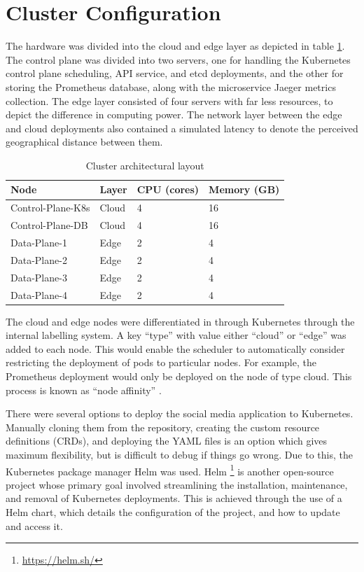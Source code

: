 \section{Cluster Configuration}
\label{sec:ch5-cluster-config}

The hardware was divided into the cloud and edge layer as depicted in table \ref{tab:cluster-hw-overview}. The control plane was divided into two servers, one for handling the Kubernetes control plane scheduling, API service, and etcd deployments, and the other for storing the Prometheus database, along with the microservice Jaeger metrics collection. The edge layer consisted of four servers with far less resources, to depict the difference in computing power. The network layer between the edge and cloud deployments also contained a simulated latency to denote the perceived geographical distance between them.\par

\begin{table}
    \caption{Cluster architectural layout}\label{tab:cluster-hw-overview}
    \centering
    \begin{tabular}{|l|l|l|l|}
        \hline
        Node & Layer & CPU (cores) & Memory (GB)\\
        \hline
        Control-Plane-K8s & Cloud & 4 & 16\\
        Control-Plane-DB  & Cloud & 4 & 16\\
        Data-Plane-1      & Edge  & 2 & 4\\
        Data-Plane-2      & Edge  & 2 & 4\\
        Data-Plane-3      & Edge  & 2 & 4\\
        Data-Plane-4      & Edge  & 2 & 4\\
        \hline
    \end{tabular}
\end{table}

The cloud and edge nodes were differentiated in through Kubernetes through the internal labelling system. A key ``type'' with value either ``cloud'' or ``edge'' was added to each node. This would enable the scheduler to automatically consider restricting the deployment of pods to particular nodes. For example, the Prometheus deployment would only be deployed on the node of type cloud. This process is known as ``node affinity'' \cite{santos2019towards}.\par

There were several options to deploy the social media application to Kubernetes. Manually cloning them from the repository, creating the custom resource definitions (CRDs), and deploying the YAML files is an option which gives maximum flexibility, but is difficult to debug if things go wrong. Due to this, the Kubernetes package manager Helm was used. Helm \footnote{\url{https://helm.sh/}} is another open-source project whose primary goal involved streamlining the installation, maintenance, and removal of Kubernetes deployments. This is achieved through the use of a Helm chart, which details the configuration of the project, and how to update and access it.\par

